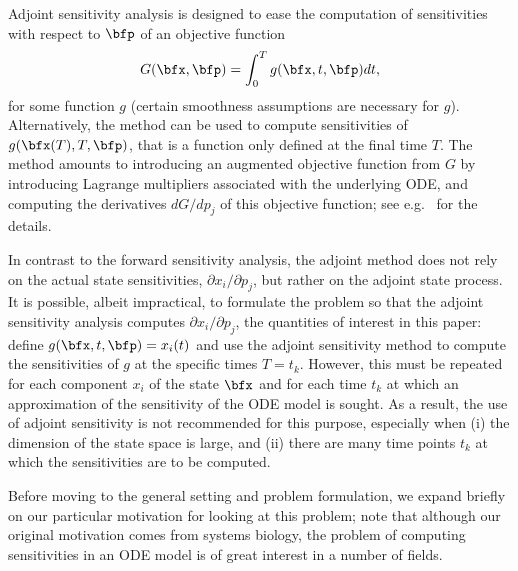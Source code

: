 \documentclass[DIV=12]{scrartcl} %
\theoremstyle{definition}
\begin{document}
Adjoint sensitivity analysis is designed to ease the computation of sensitivities with respect to $\bfp$ of an objective function
\begin{align*}
    G(\bfx, \bfp) = \int _0 ^T g(\bfx, t, \bfp) dt,
\end{align*}
for some function $g$ (certain smoothness assumptions are necessary for $g$). Alternatively, the method can be used to compute sensitivities of $g(\bfx (T), T, \bfp)$, that is a function only defined at the final time $T$. The method amounts to introducing an augmented objective function from $G$ by introducing Lagrange multipliers associated with the underlying ODE, and computing the derivatives $dG/dp_j$ of this objective function; see e.g.\ \cite{CLPR03, Marchuk95, MAS96} for the details.

In contrast to the forward sensitivity analysis, the adjoint method does not rely on the actual state sensitivities, $\partial x_i / \partial p_j$, but rather on the adjoint state process. It is possible, albeit impractical, to formulate the problem so that the adjoint sensitivity analysis computes $\partial x_i / \partial p_j$, the quantities of interest in this paper: define $g(\bfx,t,\bfp)=x_i(t)$ and use the adjoint sensitivity method to compute the sensitivities of $g$ at the specific times $T=t_k$. However, this must be repeated for each component $x_i$ of the state $\bfx$ and for each time $t_k$ at which an approximation of the sensitivity of the ODE model is sought. As a result, the use of adjoint sensitivity is not recommended for this purpose, especially when (i) the dimension of the state space is large, and (ii) there are many time points $t_k$ at which the sensitivities are to be computed.

 
Before moving to the general setting and problem formulation, we expand briefly on our particular motivation for looking at this problem; note that although our original motivation comes from systems biology, the problem of computing sensitivities in an ODE model is of great interest in a number of fields. 
\end{document}
